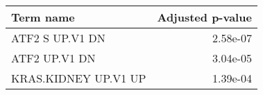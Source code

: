 \begin{tabular}{lr}
\toprule
           Term name &  Adjusted p-value \\
\midrule
     ATF2 S UP.V1 DN &          2.58e-07 \\
       ATF2 UP.V1 DN &          3.04e-05 \\
KRAS.KIDNEY UP.V1 UP &          1.39e-04 \\
\bottomrule
\end{tabular}
